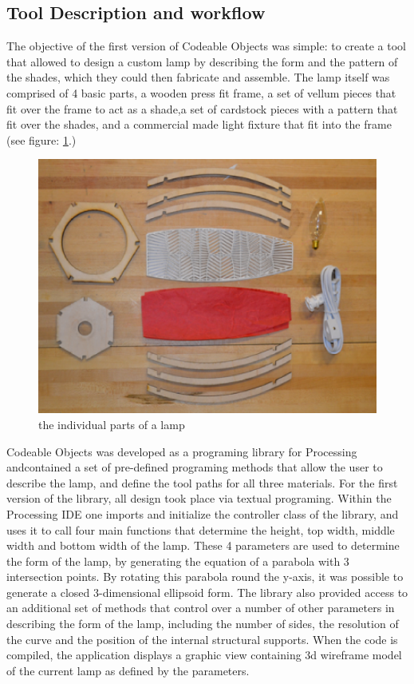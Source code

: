 \subsection{Tool Description and workflow}
The objective of the first version of Codeable Objects was simple: to create a tool that allowed to design a custom lamp by describing the form and the pattern of the shades, which they could then fabricate and assemble. The lamp itself was comprised of 4 basic parts, a wooden press fit frame, a set of vellum pieces that fit over the frame to act as a shade,a set of cardstock pieces with a pattern that fit over the shades, and a commercial made light fixture that fit into the frame (see figure: \ref{fig:lamp_parts}.)
\begin{center}
\begin{figure}[h!]
\includegraphics[width=5.337in]{images/parts.png}
\caption{the individual parts of a lamp}
\label{fig:lamp_parts}
\end{figure}
\end{center}
Codeable Objects was developed as a programing library for Processing andcontained a set of pre-defined programing methods that allow the user to describe the lamp, and define the tool paths for all three materials. For the first version of the library, all design took place via textual programing. Within the Processing IDE one imports and initialize the controller class of the library, and uses it to call four main functions that determine the height, top width, middle width and bottom width of the lamp. These 4 parameters are used to determine the form of the lamp, by generating the equation of a parabola with 3 intersection points. By rotating this parabola round the y-axis, it was possible to generate a closed 3-dimensional ellipsoid form.  The library also provided access to an additional set of methods that control over a number of other parameters in describing the form of the lamp, including the number of sides, the resolution of the curve and the position of the internal structural supports.  When the code is compiled, the application displays a graphic view containing 3d wireframe model of the current lamp as defined by the parameters. 


